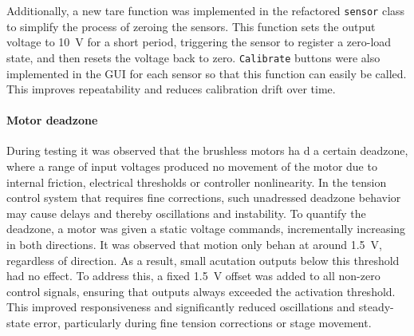 Additionally, a new tare function was implemented in the refactored \texttt{sensor} class to simplify the process of zeroing the sensors. This function sets the output voltage to \SI{10}{\volt} for a short period, triggering the sensor to register a zero-load state, and then resets the voltage back to zero. \texttt{Calibrate} buttons were also implemented in the GUI for each sensor so that this function can easily be called. This improves repeatability and reduces calibration drift over time.

\paragraph*{Motor deadzone}
During testing it was observed that the brushless motors ha d a certain deadzone, where a range of input voltages produced no movement of the motor due to internal friction, electrical thresholds or controller nonlinearity. In the tension control system that requires fine corrections, such unadressed deadzone behavior may cause delays and thereby oscillations and instability.
\newline \newline 
To quantify the deadzone, a motor was given a static voltage commands, incrementally increasing in both directions. It was observed that motion only behan at around \SI{1.5}{\volt}, regardless of direction. As a result, small acutation outputs below this threshold had no effect.
\newline \newline
To address this, a fixed \SI{1.5}{\volt} offset was added to all non-zero control signals, ensuring that outputs always exceeded the activation threshold. This improved responsiveness and significantly reduced oscillations and steady-state error, particularly during fine tension corrections or stage movement.

